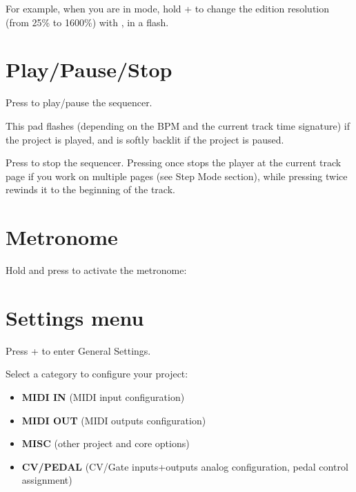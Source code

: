 For example, when you are in  mode, hold  +  to change the edition resolution (from 25\% to 1600\%) with \encodericon{}, in a flash.


\section{Play/Pause/Stop}

Press \playicon{} to play/pause the sequencer.

This pad flashes (depending on the BPM and the current track time signature) if the project is played, and is softly backlit if the project is paused.

Press \stopicon{} to stop the sequencer. Pressing once stops the player at the current track page if you work on multiple pages (see Step Mode section), while pressing twice rewinds it to the beginning of the track.




\section{Metronome}

Hold  and press  to activate the metronome:




\section{Settings menu}

Press  +  to enter General Settings.


Select a category to configure your project:

\begin{itemize}
\item \textbf{MIDI IN} (MIDI input configuration)
\item \textbf{MIDI OUT} (MIDI outputs configuration)
\item \textbf{MISC} (other project and core options)
\item \textbf{CV/PEDAL} (CV/Gate inputs+outputs analog configuration, pedal control assignment)
\end{itemize}

